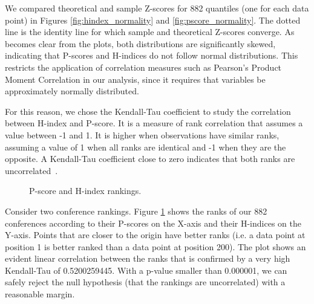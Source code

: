 \documentclass[man]{apa6}
\begin{document}
We compared theoretical and sample Z-scores for 882 quantiles (one for each data point) in Figures
\ref{fig:hindex_normality} and \ref{fig:pscore_normality}. The dotted line is the identity line for
which sample and theoretical Z-scores converge. As becomes clear from the plots, both distributions
are significantly skewed, indicating that P-scores and H-indices do not follow normal
distributions. This restricts the application of correlation measures such as Pearson's Product 
Moment Correlation in our analysis, since it requires that variables be approximately normally 
distributed. 

For this reason, we chose the Kendall-Tau coefficient to
study the correlation 
between H-index and P-score. It is a measure of rank
correlation that assumes a value between
-1 and 1. It is higher when observations have similar
ranks, assuming a value of 1
when all ranks are identical and -1 when they are the
opposite. A Kendall-Tau coefficient close to zero indicates
that both ranks are uncorrelated~\cite{Kendall1955, Baeza-Yates2011}.

\begin{figure}[h!]
  \begin{center}
    \caption{P-score and H-index rankings.}
    \label{fig:pscore_hindex_ranks}
  \end{center}
\end{figure}

Consider two conference rankings. Figure \ref{fig:pscore_hindex_ranks} shows the ranks of our 882 conferences according to
their P-scores
on the X-axis and their H-indices on the Y-axis. Points that are closer to the origin have better ranks (i.e. a data point at position 1 is better ranked than a data point at position 200).
The plot shows an evident linear correlation between the ranks that is confirmed
by a very high Kendall-Tau of 0.5200259445. With a p-value smaller than 0.000001, we can safely reject the null 
hypothesis (that the rankings are uncorrelated) with a reasonable margin.
\end{document}
